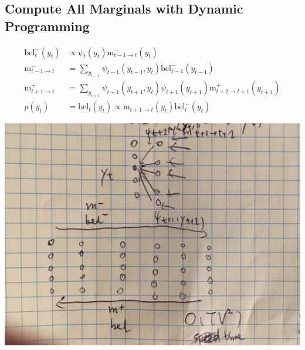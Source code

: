\documentclass{article}
\newcommand{\bel}{\text{bel}}
\newcommand{\m}{\text{m}}
\begin{document}
\subsection{Compute All Marginals with Dynamic Programming}
\begin{align*}
\bel_t^-(y_t) &\propto \psi_t(y_t) \m_{t-1 \rightarrow t}^-(y_t)\\
\m_{t-1\rightarrow t}^- &=\sum_{y_{t-1}}\psi_{t-1}(y_{t-1},y_t)\bel_{t-1}^-(y_{t-1})\\
\m_{t+1\rightarrow t}^+ &= \sum_{y_{t+1}}\psi_{t+1}(y_{t+1},y_t)\psi_{t+1}(y_{t+1})\m_{t+2\rightarrow t+1}^+(y_{t+1})\\
p(y_t)&=\bel_t(y_t)\propto \m_{t+1\rightarrow t}(y_t)\bel_t^-(y_t)
\end{align*}
\begin{center}
\includegraphics[scale=0.1]{g1.jpg}
\end{center}
\end{document}
